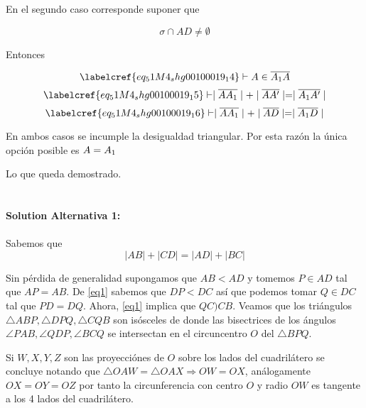 En el segundo caso corresponde suponer que

\begin{equation} \label{eq_51M4_shg00100019_14}
	\sigma \cap AD \neq \emptyset
\end{equation}

Entonces 

\begin{equation} \label{eq_51M4_shg00100019_15}
	\labelcref{eq_51M4_shg00100019_14} \vdash A \in \overline{A\textsubscript{1}A}
\end{equation}
\begin{equation} \label{eq_51M4_shg00100019_16}
	\labelcref{eq_51M4_shg00100019_15} \vdash \mid\overline{AA\textsubscript{1}}\mid + \mid\overline{AA'}\mid = \mid\overline{A\textsubscript{1}A'}\mid
\end{equation}
\begin{equation} \label{eq_51M4_shg00100019_17}
	\labelcref{eq_51M4_shg00100019_16} \vdash \mid\overline{AA\textsubscript{1}}\mid + \mid\overline{AD}\mid = \mid\overline{A\textsubscript{1}D}\mid
\end{equation}

En ambos casos se incumple la desigualdad triangular. Por esta razón la única opción posible es $A = A\textsubscript{1}$

\vspace{1cm}
Lo que queda demostrado. \\\\\\

\noindent\textbf{Solution Alternativa 1:}\\\\

Sabemos que 
\begin{equation}
\label{eq1}
|AB| + |CD| = |AD| + |BC|
\end{equation}


Sin pérdida de generalidad supongamos que $AB < AD$ y tomemos $P\in AD$ tal que $AP = AB$. De \eqref{eq1} sabemos que $DP < DC$ así que podemos tomar $Q\in DC$ tal que $PD =DQ$. Ahora, \eqref{eq1} implica que $QC ) CB$. Veamos que los triángulos $\triangle  ABP, \triangle DPQ, \triangle CQB$ son isósceles de donde las bisectrices de los ángulos $\angle  PAB, \angle QDP, \angle BCQ$ se intersectan en el circuncentro $O$ del $\triangle BPQ$.

Si $W,X,Y,Z$ son las proyecciónes de $O$ sobre los lados del cuadrilátero se concluye notando que $\triangle OAW = \triangle OAX \Rightarrow OW = OX$, análogamente $OX = OY = OZ$ por tanto la circunferencia con centro $O$ y radio $OW$ es tangente a los 4 lados del cuadrilátero.